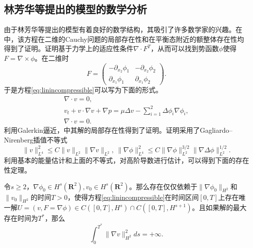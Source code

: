\documentclass{article}
\begin{document}
\subsection{林芳华等提出的模型的数学分析}
由于林芳华等提出的模型有着良好的数学结构，其吸引了许多数学家的兴趣\cite{lin2005hydrodynamics,lebon2008classical,qian2010well,qian2011initial,hu2012formation,hu2015global}。在\cite{lin2005hydrodynamics}中，该方程在二维的Cauchy问题的局部存在性和在平衡态附近的额整体存在性均得到了证明。证明基于力学上的适应性条件$\nabla \cdot F^T$，从而可以找到势函数$\phi$使得$F = \nabla \times \phi$。在二维时
\begin{equation*}
	F = \left( \begin{matrix}
		-\partial_{x_2} \phi_1 &　-\partial_{x_2} \phi_2 \\
		\partial_{x_1} \phi_1 & \partial_{x_1} \phi_2
	\end{matrix}\right).
\end{equation*}
于是方程\eqref{eq:linincompressible}可以写为下面的形式。
\begin{eqnarray*}
	\nabla \cdot v = 0, \\
	v_t + v \cdot \nabla v + \nabla p =  \mu \Delta v - \sum_{i=1}^2 \Delta \phi_i \nabla \phi_i, \\
	\nabla \cdot v = 0.
\end{eqnarray*}
利用Galerkin逼近，\cite{lin2005hydrodynamics}中其解的局部存在性得到了证明。证明采用了Gagliardo–Nirenberg插值不等式
\begin{equation*}
	\|v\|_{L^4}^2 \le C \|v\|_{L^2} \| \nabla v\|_{L^2} ,\ \|\nabla \phi\|_{L^4}^2 \le C \|\nabla \phi\|_{L^2}^{3/2} \|\nabla \Delta \phi\|_{L^2}^{1/2}.
\end{equation*}
利用基本的能量估计和上面的不等式，对高阶导数进行估计，可以得到下面的存在性定理\cite{lin2005hydrodynamics}。
\begin{theorem}
	令$s \ge 2$，$\nabla \phi_0 \in H^s(\mathbf{R}^2),v_0 \in H^s(\mathbf{R}^2)$。那么存在仅仅依赖于$\|\nabla \phi_0\|_{H^2}$和$\|v_0\|_{H^2}$的时间$T>0$，使得方程\eqref{eq:linincompressible}在时间区间$[0,T]$上存在唯一解$U=(v,F=\nabla \phi) \in C([0,T],H^s) \cap C([0,T],H^{s+1})$。且如果解的最大存在时间为$T^*$，那么
	\begin{equation*}
		\int_0^{T^*} \|\nabla v\|_{H^2}^2 ds = + \infty.
	\end{equation*}
\end{theorem}
\end{document}
